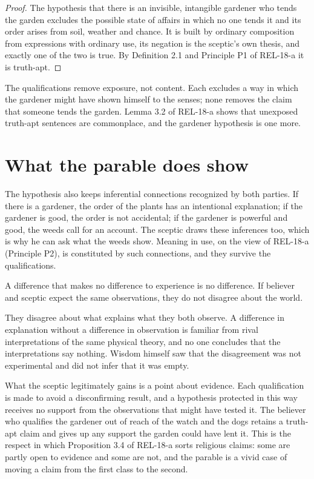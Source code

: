 \documentclass{situationist-preprint}
\begin{document}
\begin{proof}
The hypothesis that there is an invisible, intangible gardener who tends the garden excludes the possible state of affairs in which no one tends it and its order arises from soil, weather and chance. It is built by ordinary composition from expressions with ordinary use, its negation is the sceptic's own thesis, and exactly one of the two is true. By Definition 2.1 and Principle P1 of REL-18-a it is truth-apt.
\end{proof}

The qualifications remove exposure, not content. Each excludes a way in which the gardener might have shown himself to the senses; none removes the claim that someone tends the garden. Lemma 3.2 of REL-18-a shows that unexposed truth-apt sentences are commonplace, and the gardener hypothesis is one more.

\section{What the parable does show}

The hypothesis also keeps inferential connections recognized by both parties. If there is a gardener, the order of the plants has an intentional explanation; if the gardener is good, the order is not accidental; if the gardener is powerful and good, the weeds call for an account. The sceptic draws these inferences too, which is why he can ask what the weeds show. Meaning in use, on the view of REL-18-a (Principle P2), is constituted by such connections, and they survive the qualifications.

\begin{objection}
A difference that makes no difference to experience is no difference. If believer and sceptic expect the same observations, they do not disagree about the world.
\end{objection}

\begin{reply}
They disagree about what explains what they both observe. A difference in explanation without a difference in observation is familiar from rival interpretations of the same physical theory, and no one concludes that the interpretations say nothing. Wisdom himself saw that the disagreement was not experimental and did not infer that it was empty.
\end{reply}

What the sceptic legitimately gains is a point about evidence. Each qualification is made to avoid a disconfirming result, and a hypothesis protected in this way receives no support from the observations that might have tested it. The believer who qualifies the gardener out of reach of the watch and the dogs retains a truth-apt claim and gives up any support the garden could have lent it. This is the respect in which Proposition 3.4 of REL-18-a sorts religious claims: some are partly open to evidence and some are not, and the parable is a vivid case of moving a claim from the first class to the second.
\end{document}
